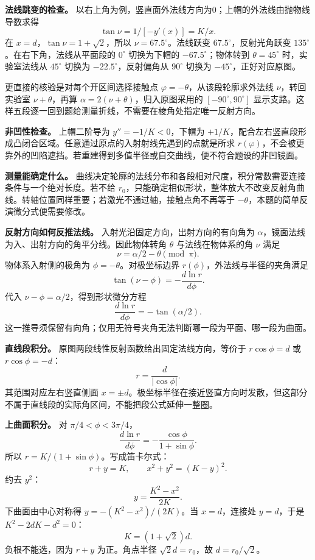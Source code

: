 \documentclass[12pt,a4paper,UTF8]{ctexart}
\begin{document}
\textbf{法线跳变的检查。}
以右上角为例，竖直面外法线方向为0；上帽的外法线由抛物线导数求得 \[
\tan\nu=1/[-y'(x)]=K/x.
\] 在 \(x=d\)，\(\tan\nu=1+\sqrt2\)，所以 \(\nu=67.5^\circ\)。法线跃变
\(67.5^\circ\)，反射光角跃变 \(135^\circ\)。在右下角，法线从平面段的
\(0^\circ\) 切换为下帽的 \(-67.5^\circ\)；物体转到 \(\theta=45^\circ\)
时，实验室法线从 \(45^\circ\) 切换为 \(-22.5^\circ\)，反射偏角从
\(90^\circ\) 切换为 \(-45^\circ\)，正好对应原图。

更直接的核验是对每个开区间选择接触点
\(\varphi=-\theta\)，从该段轮廓求外法线 \(\nu\)，转回实验室
\(\nu+\theta\)，再算 \(\alpha=2(\nu+\theta)\)，归入原图采用的
\([-90^\circ,90^\circ]\)
显示支路。这样五段逐一回到题给测量折线，不需要在棱角处指定唯一反射方向。

\textbf{非凹性检查。} 上帽二阶导为 \(y''=-1/K<0\)，下帽为
\(+1/K\)，配合左右竖直段形成凸闭合区域。任意通过原点的入射射线先遇到的点就是所求
\(r(\varphi)\)，不会被更靠外的凹陷遮挡。若重建得到多值半径或自交曲线，便不符合题设的非凹镜面。

\textbf{测量能确定什么。}
曲线决定轮廓的法线分布和各段相对尺度，积分常数需要连接条件与一个绝对长度。若不给
\(r_0\)，只能确定相似形状，整体放大不改变反射角曲线。转轴位置同样重要；若激光不通过轴，接触点角不再等于
\(-\theta\)，本题的简单反演微分式便需要修改。

\textbf{反射方向如何反推法线。} 入射光沿固定方向，出射方向的有向角为
\(\alpha\)，镜面法线为入、出射方向的角平分线。因此物体转角 \(\theta\)
与法线在物体系的角 \(\nu\) 满足 \[
\nu=\alpha/2-\theta\pmod\pi.
\] 物体系入射侧的极角为 \(\phi=-\theta\)。对极坐标边界
\(r(\phi)\)，外法线与半径的夹角满足 \[
\tan(\nu-\phi)=-\frac{d\ln r}{d\phi}.
\] 代入 \(\nu-\phi=\alpha/2\)，得到形状微分方程 \[
\frac{d\ln r}{d\phi}=-\tan(\alpha/2).
\]
这一推导须保留有向角；仅用无符号夹角无法判断哪一段为平面、哪一段为曲面。

\textbf{直线段积分。} 原图两段线性反射函数给出固定法线方向，等价于
\(r\cos\phi=d\) 或 \(r\cos\phi=-d\)： \[
r=\frac d{|\cos\phi|}.
\] 其范围对应左右竖直侧面
\(x=\pm d\)。极坐标半径在接近竖直方向时发散，但这部分不属于直线段的实际角区间，不能把段公式延伸一整圈。

\textbf{上曲面积分。} 对 \(\pi/4<\phi<3\pi/4\)， \[
\frac{d\ln r}{d\phi}=-\frac{\cos\phi}{1+\sin\phi}.
\] 所以 \(r=K/(1+\sin\phi)\)。写成笛卡尔式： \[
r+y=K,\qquad x^2+y^2=(K-y)^2.
\] 约去 \(y^2\)： \[
\boxed{y=\frac{K^2-x^2}{2K}}.
\] 下曲面由中心对称得 \(y=-(K^2-x^2)/(2K)\)。当 \(x=d\)，连接处
\(y=d\)，于是 \(K^2-2dK-d^2=0\)： \[
K=(1+\sqrt2)d.
\] 负根不能选，因为 \(r+y\) 为正。角点半径 \(\sqrt2d=r_0\)，故
\(d=r_0/\sqrt2\)。
\end{document}
